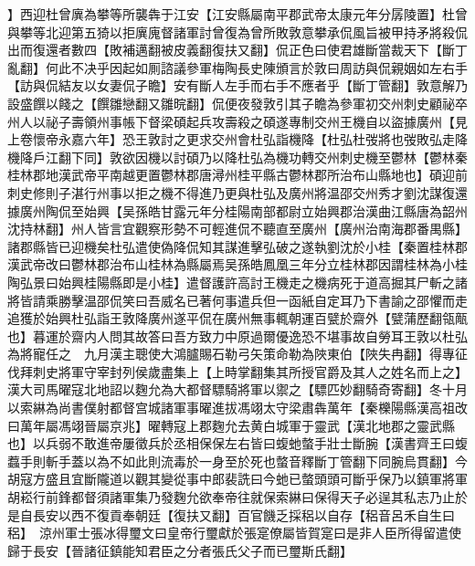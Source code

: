 】西迎杜曾廙為攀等所襲犇于江安【江安縣屬南平郡武帝太康元年分孱陵置】杜曾與攀等北迎第五猗以拒廙廆督諸軍討曾復為曾所敗敦意攀承侃風旨被甲持矛將殺侃出而復還者數四【敗補邁翻被皮義翻復扶又翻】侃正色曰使君雄斷當裁天下【斷丁亂翻】何此不决乎因起如厠諮議參軍梅陶長史陳頒言於敦曰周訪與侃親姻如左右手【訪與侃結友以女妻侃子瞻】安有斷人左手而右手不應者乎【斷丁管翻】敦意解乃設盛饌以餞之【饌雛戀翻又雛晥翻】侃便夜發敦引其子瞻為參軍初交州刺史顧祕卒州人以祕子壽領州事帳下督梁碩起兵攻壽殺之碩遂專制交州王機自以盜據廣州【見上卷懷帝永嘉六年】恐王敦討之更求交州會杜弘詣機降【杜弘杜弢將也弢敗弘走降機降戶江翻下同】敦欲因機以討碩乃以降杜弘為機功轉交州刺史機至鬱林【鬱林秦桂林郡地漢武帝平南越更置鬱林郡唐潯州桂平縣古鬱林郡所治布山縣地也】碩迎前刺史修則子湛行州事以拒之機不得進乃更與杜弘及廣州將温邵交州秀才劉沈謀復還據廣州陶侃至始興【吴孫皓甘露元年分桂陽南部都尉立始興郡治漢曲江縣唐為韶州沈持林翻】州人皆言宜觀察形勢不可輕進侃不聽直至廣州【廣州治南海郡番禺縣】諸郡縣皆已迎機矣杜弘遣使偽降侃知其謀進擊弘破之遂執劉沈於小桂【秦置桂林郡漢武帝改曰鬱林郡治布山桂林為縣屬焉吴孫皓鳳凰三年分立桂林郡因謂桂林為小桂陶弘景曰始興桂陽縣即是小桂】遣督護許高討王機走之機病死于道高掘其尸斬之諸將皆請乘勝擊温邵侃笑曰吾威名已著何事遣兵但一函紙自定耳乃下書諭之邵懼而走追獲於始興杜弘詣王敦降廣州遂平侃在廣州無事輒朝運百甓於齋外【甓蒲歷翻瓴甋也】暮運於齋内人問其故答曰吾方致力中原過爾優逸恐不堪事故自勞耳王敦以杜弘為將寵任之　九月漢主聰使大鴻臚賜石勒弓矢策命勒為陜東伯【陜失冉翻】得專征伐拜刺史將軍守宰封列侯歲盡集上【上時掌翻集其所授官爵及其人之姓名而上之】　漢大司馬曜寇北地詔以麴允為大都督驃騎將軍以禦之【驃匹妙翻騎奇寄翻】冬十月以索綝為尚書僕射都督宫城諸軍事曜進拔馮翊太守梁肅犇萬年【秦櫟陽縣漢高祖改曰萬年屬馮翊晉屬京兆】曜轉寇上郡麴允去黄白城軍于靈武【漢北地郡之靈武縣也】以兵弱不敢進帝屢徵兵於丞相保保左右皆曰蝮虵螫手壯士斷腕【漢書齊王曰蝮蠚手則斬手蓋以為不如此則流毒於一身至於死也螫音釋斷丁管翻下同腕烏貫翻】今胡寇方盛且宜斷隴道以觀其變從事中郎裴詵曰今虵已螫頭頭可斷乎保乃以鎮軍將軍胡崧行前鋒都督須諸軍集乃發麴允欲奉帝往就保索綝曰保得天子必逞其私志乃止於是自長安以西不復貢奉朝廷【復扶又翻】百官饑乏採稆以自存【稆音呂禾自生曰稆】　涼州軍士張冰得璽文曰皇帝行璽獻於張寔僚屬皆賀寔曰是非人臣所得留遣使歸于長安【晉諸征鎮能知君臣之分者張氏父子而已璽斯氏翻】

